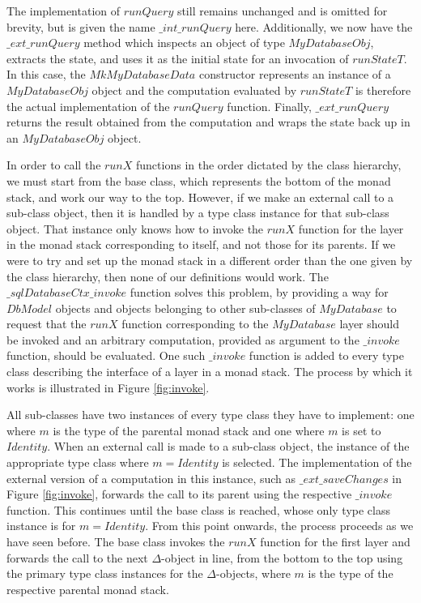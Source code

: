 The implementation of $\mathit{runQuery}$ still remains unchanged and is omitted for brevity, but is given the name $\mathit{\_int\_runQuery}$ here. Additionally, we now have the $\mathit{\_ext\_runQuery}$ method which inspects an object of type $\mathit{MyDatabaseObj}$, extracts the state, and uses it as the initial state for an invocation of $\mathit{runStateT}$. In this case, the $\mathit{MkMyDatabaseData}$ constructor represents an instance of a $\mathit{MyDatabaseObj}$ object and the computation evaluated by $\mathit{runStateT}$ is therefore the actual implementation of the $\mathit{runQuery}$ function. Finally, $\mathit{\_ext\_runQuery}$ returns the result obtained from the computation and wraps the state back up in an $\mathit{MyDatabaseObj}$ object.

In order to call the $\mathit{runX}$ functions in the order dictated by the class hierarchy, we must start from the base class, which represents the bottom of the monad stack, and work our way to the top. However, if we make an external call to a sub-class object, then it is handled by a type class instance for that sub-class object. That instance only knows how to invoke the $\mathit{runX}$ function for the layer in the monad stack corresponding to itself, and not those for its parents. If we were to try and set up the monad stack in a different order than the one given by the class hierarchy, then none of our definitions would work. The $\_\mathit{sqlDatabaseCtx\_invoke}$ function solves this problem, by providing a way for $\mathit{DbModel}$ objects and objects belonging to other sub-classes of $\mathit{MyDatabase}$ to request that the $\mathit{runX}$ function corresponding to the $\mathit{MyDatabase}$ layer should be invoked and an arbitrary computation, provided as argument to the $\_\mathit{invoke}$ function, should be evaluated.  One such $\_\mathit{invoke}$ function is added to every type class describing the interface of a layer in a monad stack. The process by which it works is illustrated in Figure \ref{fig:invoke}. 

All sub-classes have two instances of every type class they have to implement: one where $m$ is the type of the parental monad stack and one where $m$ is set to $\mathit{Identity}$. When an external call is made to a sub-class object, the instance of the appropriate type class where $m = \mathit{Identity}$ is selected. The implementation of the external version of a computation in this instance, such as $\_\mathit{ext}\_\mathit{saveChanges}$ in Figure \ref{fig:invoke}, forwards the call to its parent using the respective $\_\mathit{invoke}$ function. This continues until the base class is reached, whose only type class instance is for $m = \mathit{Identity}$. From this point onwards, the process proceeds as we have seen before. The base class invokes the $\mathit{runX}$ function for the first layer and forwards the call to the next $\Delta$-object in line, from the bottom to the top using the primary type class instances for the $\Delta$-objects, where $m$ is the type of the respective parental monad stack. 

